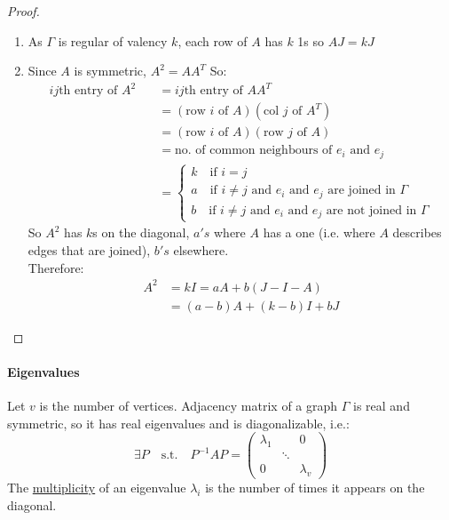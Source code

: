 \documentclass[]{article}
\theoremstyle{definition}
\theoremstyle{remark}
\numberwithin{equation}{section}
\begin{document}
		\begin{proof}
			\begin{enumerate}
				\item As $\Gamma$ is regular of valency $k$, each row of $A$ has $k$ 1s so $AJ = kJ$
				\item Since $A$ is symmetric, $A^2 = AA^T$ So:
				\begin{align*}
				  ij\text{th entry of $A^2$}\quad
				  	&= ij\text{th entry of $AA^T$}\\
				  	&= (\text{row $i$ of $A$})(\text{col $j$ of $A^T$})\\
				  	&= (\text{row $i$ of $A$})(\text{row $j$ of $A$})\\
				  	&= \text{no. of common neighbours of $e_i$ and $e_j$}\\
				  	&= \begin{cases}
				  			k \quad \text{if $i = j$}\\
				  			a \quad \text{if $i \neq j$ and $e_i$ and $e_j$ are joined in $\Gamma$}\\
				  			b \quad \text{if $i\neq j$ and $e_i$ and $e_j$ are not joined in $\Gamma$}
				  	   \end{cases}
				\end{align*}
				So $A^2$ has $k$s on the diagonal, $a's$ where $A$ has a one (i.e. where $A$ describes edges that are joined), $b's$ elsewhere.\\
				Therefore:
				\begin{align*}
					A^2 &= kI = aA + b(J-I-A)\\
						&= (a-b)A + (k-b)I + bJ
				\end{align*}
			\end{enumerate}
		\end{proof}

		\paragraph{Eigenvalues} Let $v$ is the number of vertices. Adjacency matrix of a graph $\Gamma$ is real and symmetric, so it has real eigenvalues and is diagonalizable, i.e.:
		\[
			\exists P \quad\text{s.t.}\quad 
			P^{-1}AP = \begin{pmatrix}
						\lambda_1 & & 0\\
						& \ddots & \\
						0 & & \lambda_v
						\end{pmatrix}
		\]
		The \underline{multiplicity} of an eigenvalue $\lambda_i$  is the number of times it appears on the diagonal.
\end{document}
